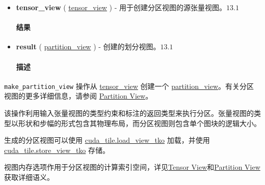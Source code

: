 \documentclass{article}
\begin{document}
\begin{itemize}
\item \textbf{tensor\_view} ( \href{https://docs.nvidia.com/cuda/tile-ir/latest/sections/types.html#type-tensor-view}{tensor\_view} ) - 用于创建分区视图的源张量视图。$\boxed{13.1}$




\paragraph{结果}


\item \textbf{result} ( \href{https://docs.nvidia.com/cuda/tile-ir/latest/sections/types.html#type-partition-view}{partition\_view} ) - 创建的划分视图。$\boxed{13.1}$




\paragraph{描述}


\end{itemize}
\texttt{make\_partition\_view} 操作从 \href{https://docs.nvidia.com/cuda/tile-ir/latest/sections/types.html#type-tensor-view}{tensor\_view} 创建一个 \href{https://docs.nvidia.com/cuda/tile-ir/latest/sections/types.html#type-partition-view}{partition\_view}。有关分区视图的更多详细信息，请参阅 \href{https://docs.nvidia.com/cuda/tile-ir/latest/sections/types.html#type-partition-view}{Partition View}。



该操作利用输入张量视图的类型约束和标注的返回类型来执行分区。张量视图的类型以形状和步幅的形式包含其物理布局，而分区视图则包含单个图块的逻辑大小。



生成的分区视图可以使用 \href{https://docs.nvidia.com/cuda/tile-ir/latest/sections/operations.html#op-cuda-tile-load-view-tko}{cuda\_tile.load\_view\_tko} 加载，并使用 \href{https://docs.nvidia.com/cuda/tile-ir/latest/sections/operations.html#op-cuda-tile-store-view-tko}{cuda\_tile.store\_view\_tko} 存储。



视图内存选项作用于分区视图的计算索引空间，详见\href{https://docs.nvidia.com/cuda/tile-ir/latest/sections/types.html#type-tensor-view}{Tensor View}和\href{https://docs.nvidia.com/cuda/tile-ir/latest/sections/types.html#type-partition-view}{Partition View}获取详细语义。
\end{document}

